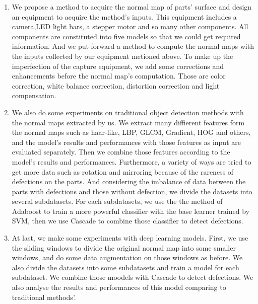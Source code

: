 \begin{englishabstract}
\begin{enumerate}
\item We propose a method to acquire the normal map of parts' surface and  design an equipment to acquire the method's inputs. 
This equipment includes a camera,LED light bars, a stepper motor and so many other components. 
All components are constituted into five models so that we could get required information.
And we put forward a method to compute the normal maps with the inputs collected by our equipment metioned above.
To make up the imperfection of the capture equipment,
we add some corrections and enhancements before the normal map's computation.
Those are
color correction,
white balance correction,
distortion correction 
and light compensation.
\item 
We also do some experiments on traditional object detection methods with the normal maps extracted by us.
We extract many diffierent features form the normal maps such as haar-like, LBP, GLCM, Gradient, HOG and others,
and the model's results and performances with those features as input are evaluated separately.
Then we combine those features according to the model's results and performances. 
Furthermore, a variety of ways are tried to get more data such as rotation and mirroring because of the rareness of defections on the parts.
And considering the imbalance of data between the parts with defections and those without defection, 
we divide the datasets into several subdatasets.
For each subdatasets,
we use the the method of Adaboost to train a more powerful classifier with the base learner trained by SVM, then we use Cascade to combine those classifier to detect defections.
\item At last, we make some experiments with deep learning models. 
First, we use the sliding windows to divide the original normal map into some smaller windows,
and do some data augmentation on those windows as before. 
We also divide the datasets into some subdatasets and train a model for each subdataset.
We combine those moodels with Cascade to detect defections.
We also analyse the results and performances of this model comparing to traditional methods'.
\end{enumerate}






\end{englishabstract}
